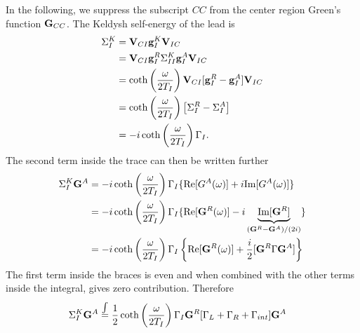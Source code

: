 In the following, we suppress the subscript $CC$ from the center region Green's function $\mathbf{G}_{CC}$. The Keldysh self-energy of the lead is
\begin{alignat}{2}
 \Sigma_I^K &= \mathbf{V}_{CI} \mathbf{g}_I^K \mathbf{V}_{IC} \\
  &= \mathbf{V}_{CI} \mathbf{g}_I^R \Sigma_{II}^K \mathbf{g}_{I}^A\mathbf{V}_{IC} \\
  &= \coth\left(\frac{\omega}{2T_I}\right) \mathbf{V}_{CI} [\mathbf{g}_I^R-\mathbf{g}_I^A] \mathbf{V}_{IC} \\
  &= \coth\left(\frac{\omega}{2T_I}\right) \left[ \Sigma_I^R - \Sigma_I^A \right] \\
  &= -i \coth\left(\frac{\omega}{2T_I}\right) \Gamma_I.
\end{alignat}
The second term inside the trace can then be written further 
\begin{alignat}{2}
 \Sigma_I^K \mathbf{G}^A &= -i \coth\left(\frac{\omega}{2T_I}\right) \Gamma_I \{\textrm{Re}[G^A(\omega)] + i \textrm{Im}[G^A(\omega)] \} \\
  &=-i \coth\left(\frac{\omega}{2T_I}\right) \Gamma_I \{\textrm{Re}[\mathbf{G}^R(\omega)] - i \underbrace{\textrm{Im}[\mathbf{G}^R]}_{(\mathbf{G}^R-\mathbf{G}^A)/(2i)} \} \\
  &=-i \coth\left(\frac{\omega}{2T_I}\right) \Gamma_I \left\{\textrm{Re}[\mathbf{G}^R(\omega)] + \frac{i}{2} [\mathbf{G}^R \Gamma \mathbf{G}^A] \right\}
\end{alignat}
The first term inside the braces is even and when combined with the other terms inside the integral, gives zero contribution. Therefore
\begin{alignat}{2}
 \Sigma_I^K \mathbf{G}^A & \hspace{-0mm}\stackrel{\int} {=} \frac{1}{2} \coth\left(\frac{\omega}{2T_I}\right)  \Gamma_I \mathbf{G}^R [\Gamma_L+\Gamma_R+\Gamma_{int}] \mathbf{G}^A
\end{alignat}

